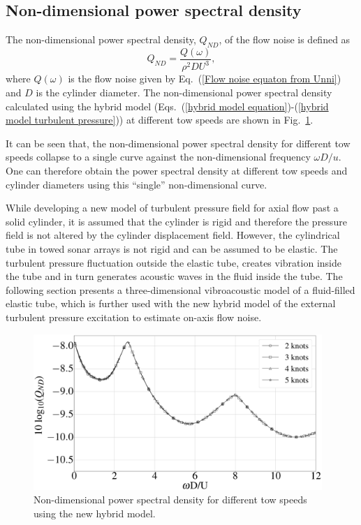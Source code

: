 \documentclass[11pt,cleanfoot]{asme2ej}
\begin{document}
\subsection{Non-dimensional power spectral density}
The non-dimensional power spectral density, $Q_{ND}$, of the flow noise is defined as
\begin{equation}
    Q_{ND} = \frac{Q(\omega)}{\rho^2 D U^3},
\end{equation}
where $Q(\omega)$ is the flow noise given by Eq.~(\ref{Flow noise equaton from Unni}) and $D$ is the cylinder diameter. The non-dimensional power spectral density calculated using the hybrid model (Eqs.~(\ref{hybrid model equation})-(\ref{hybrid model turbulent pressure})) at different tow speeds are shown in Fig.~\ref{non dimensional plot of hybrid model}.

It can be seen that, the non-dimensional power spectral density for different tow speeds collapse to a single curve against the non-dimensional frequency $\omega D/u$. One can therefore obtain the power spectral density at different tow speeds and cylinder diameters using this ``single'' non-dimensional curve.


While developing a new model of turbulent pressure field for axial flow past a solid cylinder, it is assumed that the cylinder is rigid and therefore the pressure field is not altered by the cylinder displacement field. However, the cylindrical tube in towed sonar arrays is not rigid and can be assumed to be elastic. The turbulent pressure fluctuation outside the elastic tube, creates vibration inside the tube and in turn generates acoustic waves in the fluid inside the tube. The following section presents a three-dimensional vibroacoustic model of a fluid-filled elastic tube, which is further used with the new hybrid model of the external turbulent pressure excitation to estimate on-axis flow noise.

\begin{figure}
    \centerline{
    \includegraphics[width=4.3in]{Non_dimensional_plot_of_hybrid_model.eps}}
    \caption{Non-dimensional power spectral density for different tow speeds using the new hybrid model.}
    \label{non dimensional plot of hybrid model}
\end{figure}
\end{document}
